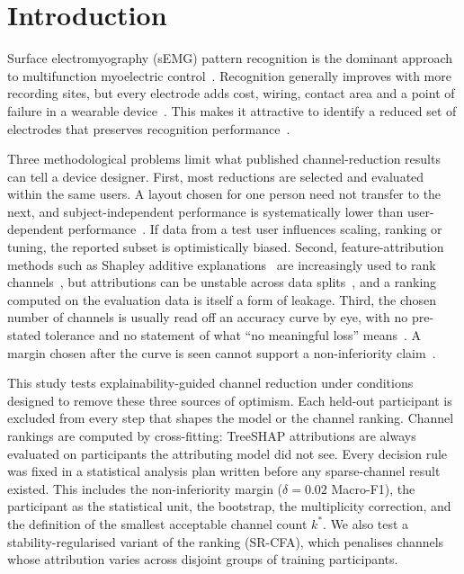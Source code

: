 \section{Introduction}
\label{sec:introduction}

Surface electromyography (sEMG) pattern recognition is the dominant approach to multifunction myoelectric control~\cite{hudgins1993new,englehart2003robust,scheme2011electromyogram,farina2014extraction}. Recognition generally improves with more recording sites, but every electrode adds cost, wiring, contact area and a point of failure in a wearable device~\cite{vujaklija2016new}. This makes it attractive to identify a reduced set of electrodes that preserves recognition performance~\cite{phinyomark2012feature,liu2014emg,altimemy2013classification,stango2015spatial,qu2021reduce}.

Three methodological problems limit what published channel-reduction results can tell a device designer. First, most reductions are selected and evaluated within the same users. A layout chosen for one person need not transfer to the next, and subject-independent performance is systematically lower than user-dependent performance~\cite{phinyomark2018emg,cote2019deep}. If data from a test user influences scaling, ranking or tuning, the reported subset is optimistically biased. Second, feature-attribution methods such as Shapley additive explanations~\cite{lundberg2017unified,lundberg2020local} are increasingly used to rank channels~\cite{salmi2025shapaad}, but attributions can be unstable across data splits~\cite{visani2022statistical,kelodjou2023shaping,xiang2026roshap}, and a ranking computed on the evaluation data is itself a form of leakage. Third, the chosen number of channels is usually read off an accuracy curve by eye, with no pre-stated tolerance and no statement of what ``no meaningful loss'' means~\cite{schuirmann1987comparison,walker2011understanding}. A margin chosen after the curve is seen cannot support a non-inferiority claim~\cite{campbell2018noninferiority}.

This study tests explainability-guided channel reduction under conditions designed to remove these three sources of optimism. Each held-out participant is excluded from every step that shapes the model or the channel ranking. Channel rankings are computed by cross-fitting: TreeSHAP attributions are always evaluated on participants the attributing model did not see. Every decision rule was fixed in a statistical analysis plan written before any sparse-channel result existed. This includes the non-inferiority margin ($\delta = 0.02$ Macro-F1), the participant as the statistical unit, the bootstrap, the multiplicity correction, and the definition of the smallest acceptable channel count $k^*$. We also test a stability-regularised variant of the ranking (SR-CFA), which penalises channels whose attribution varies across disjoint groups of training participants.

